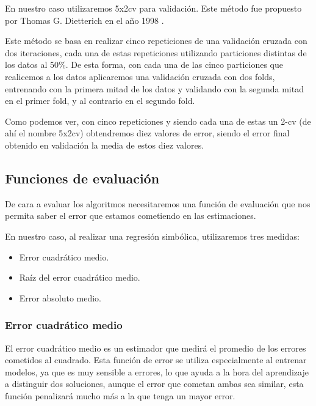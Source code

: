 En nuestro caso utilizaremos 5x2cv para validación. Este método fue propuesto por Thomas G. Dietterich en el año 1998 \cite{propuesta5x2cv}.

Este método se basa en realizar cinco repeticiones de una validación cruzada con dos iteraciones, cada una de estas repeticiones utilizando particiones distintas de los datos al 50\%. De esta forma, con cada una de las cinco particiones que realicemos a los datos aplicaremos una validación cruzada con dos folds, entrenando con la primera mitad de los datos y validando con la segunda mitad en el primer fold, y al contrario en el segundo fold.

Como podemos ver, con cinco repeticiones y siendo cada una de estas un 2-cv (de ahí el nombre 5x2cv) obtendremos diez valores de error, siendo el error final obtenido en validación la media de estos diez valores.



\newpage

\subsection{Funciones de evaluación}

De cara a evaluar los algoritmos necesitaremos una función de evaluación que nos permita saber el error que estamos cometiendo en las estimaciones.

En nuestro caso, al realizar una regresión simbólica, utilizaremos tres medidas:

\begin{itemize}
	\item Error cuadrático medio.
	\item Raíz del error cuadrático medio.
	\item Error absoluto medio.
\end{itemize}

\subsubsection{Error cuadrático medio}

El error cuadrático medio es un estimador que medirá el promedio de los errores cometidos al cuadrado. Esta función de error se utiliza especialmente al entrenar modelos, ya que es muy sensible a errores, lo que ayuda a la hora del aprendizaje a distinguir dos soluciones, aunque el error que cometan ambas sea similar, esta función penalizará mucho más a la que tenga un mayor error.

